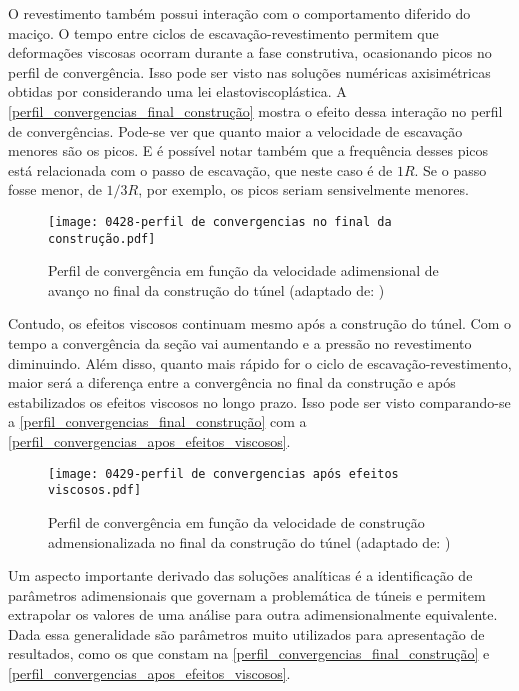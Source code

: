 O revestimento também possui interação com o comportamento diferido do maciço. O tempo entre ciclos de escavação-revestimento permitem que deformações viscosas ocorram durante a fase construtiva, ocasionando picos no perfil de convergência. Isso pode ser visto nas soluções numéricas axisimétricas obtidas por  considerando uma lei elastoviscoplástica. A \autoref{perfil_convergencias_final_construção} mostra o efeito dessa interação no perfil de convergências. Pode-se ver que quanto maior a velocidade de escavação menores são os picos. E é possível notar também que a frequência desses picos está relacionada com o passo de escavação, que neste caso é de $1R$. Se o passo fosse menor, de $1/3R$, por exemplo, os picos seriam sensivelmente menores.

\begin{figure}[H]
	\begin{center}
		\texttt{[image: 0428-perfil de convergencias no final da construção.pdf]}
	\end{center}
	\caption{\label{perfil_convergencias_final_construção}Perfil de convergência em função da velocidade adimensional de avanço no final da construção do túnel (adaptado de: )}
\end{figure}

Contudo, os efeitos viscosos continuam mesmo após a construção do túnel. Com o tempo a convergência da seção vai aumentando e a pressão no revestimento diminuindo. Além disso, quanto mais rápido for o ciclo de escavação-revestimento, maior será a diferença entre a convergência no final da construção e após estabilizados os efeitos viscosos no longo prazo. Isso pode ser visto comparando-se a \autoref{perfil_convergencias_final_construção} com a \autoref{perfil_convergencias_apos_efeitos_viscosos}.

\begin{figure}[H]
	\begin{center}
		\texttt{[image: 0429-perfil de convergencias após efeitos viscosos.pdf]}
	\end{center}
	\caption{\label{perfil_convergencias_apos_efeitos_viscosos}Perfil de convergência em função da velocidade de construção admensionalizada no final da construção do túnel (adaptado de: )}
\end{figure}

Um aspecto importante derivado das soluções analíticas é a identificação de parâmetros adimensionais que governam a problemática de túneis e permitem extrapolar os valores de uma análise para outra adimensionalmente equivalente. Dada essa generalidade são parâmetros muito utilizados para apresentação de resultados, como os que constam na \autoref{perfil_convergencias_final_construção} e \autoref{perfil_convergencias_apos_efeitos_viscosos}.

